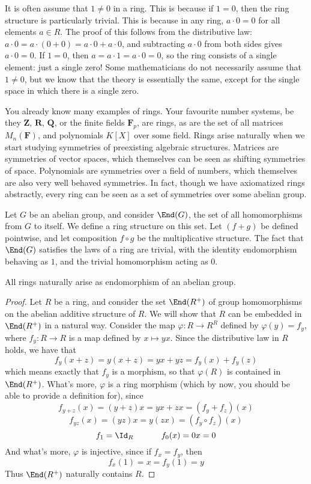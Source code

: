 It is often assume that $1 \neq 0$ in a ring. This is because if $1 = 0$, then the ring structure is particularly trivial. This is because in any ring, $a \cdot 0 = 0$ for all elements $a \in R$. The proof of this follows from the distributive law: $a \cdot 0 = a \cdot (0 + 0) = a \cdot 0 + a \cdot 0$, and subtracting $a \cdot 0$ from both sides gives $a \cdot 0 = 0$. If $1 = 0$, then $a = a \cdot 1 = a \cdot 0 = 0$, so the ring consists of a single element: just a single zero! Some mathematicians do not necessarily assume that $1 \neq 0$, but we know that the theory is essentially the same, except for the single space in which there is a single zero.

You already know many examples of rings. Your favourite number systems, be they $\mathbf{Z}$, $\mathbf{R}$, $\mathbf{Q}$, or the finite fields $\mathbf{F}_p$, are rings, as are the set of all matrices $M_n(\mathbf{F})$, and polynomials $K[X]$ over some field. Rings arise naturally when we start studying symmetries of preexisting algebraic structures. Matrices are symmetries of vector spaces, which themselves can be seen as shifting symmetries of space. Polynomials are symmetries over a field of numbers, which themselves are also very well behaved symmetries. In fact, though we have axiomatized rings abstractly, every ring can be seen as a set of symmetries over some abelian group.

\begin{example}
    Let $G$ be an abelian group, and consider $\End(G)$, the set of all homomorphisms from $G$ to itself. We define a ring structure on this set. Let $(f + g)$ be defined pointwise, and let composition $f \circ g$ be the multiplicative structure. The fact that $\End(G)$ satisfies the laws of a ring are trivial, with the identity endomorphism behaving as $1$, and the trivial homomorphism acting as $0$.
\end{example}

\begin{theorem}
    All rings naturally arise as endomorphism of an abelian group.
\end{theorem}
\begin{proof}
    Let $R$ be a ring, and consider the set $\End(R^+)$ of group homomorphisms on the abelian additive structure of $R$. We will show that $R$ can be embedded in $\End(R^+)$ in a natural way. Consider the map $\varphi: R \to R^R$ defined by $\varphi(y) = f_y$, where $f_y:R \to R$ is a map defined by $x \mapsto yx$. Since the distributive law in $R$ holds, we have that
    \[ f_y(x + z) = y(x + z) = yx + yz = f_y(x) + f_y(z) \]
    which means exactly that $f_y$ is a morphism, so that $\varphi(R)$ is contained in $\End(R^+)$. What's more, $\varphi$ is a ring morphism (which by now, you should be able to provide a definition for), since
    \[ f_{y + z}(x) = (y + z)x = yx + zx = (f_y + f_z)(x) \]
    \[ f_{yz}(x) = (yz)x = y(zx) = (f_y \circ f_z)(x) \]
    \[ f_1 = \Id_R\ \ \ \ \ \ \ \ \ \  f_0(x) = 0x = 0 \]
    And what's more, $\varphi$ is injective, since if $f_x = f_y$, then
    \[ f_x(1) = x = f_y(1) = y \]
    Thus $\End(R^+)$ naturally contains $R$.
\end{proof}

